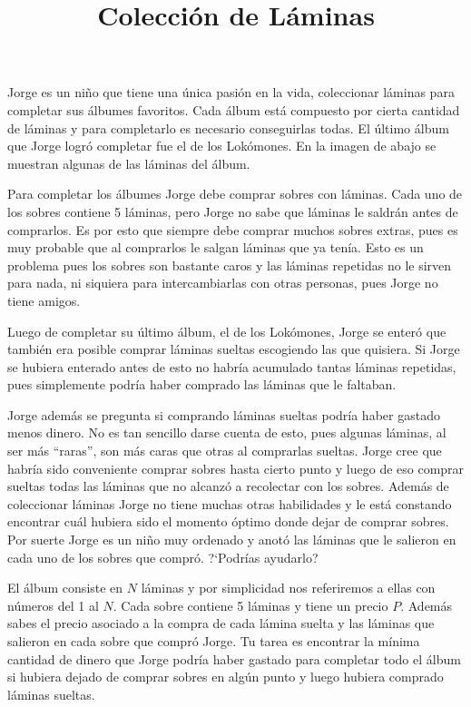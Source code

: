 \documentclass{article}
\title{Colección de Láminas}
\begin{document}
\maketitle

Jorge es un niño que tiene una única pasión en la vida, coleccionar láminas para
completar sus álbumes favoritos. Cada álbum está compuesto por cierta cantidad
de láminas y para completarlo es necesario conseguirlas todas. El último álbum
que Jorge logró completar fue el de los Lokómones. En la imagen de abajo se
muestran algunas de las láminas del álbum.

Para completar los álbumes Jorge debe comprar sobres con láminas. Cada uno de
los sobres contiene 5 láminas, pero Jorge no sabe que láminas le saldrán antes
de comprarlos. Es por esto que siempre debe comprar muchos sobres extras, pues
es muy probable que al comprarlos le salgan láminas que ya tenía. Esto es un
problema pues los sobres son bastante caros y las láminas repetidas no le sirven
para nada, ni siquiera para intercambiarlas con otras personas, pues Jorge no
tiene amigos.

Luego de completar su último álbum, el de los Lokómones, Jorge se enteró que
también era posible comprar láminas sueltas escogiendo las que quisiera. Si
Jorge se hubiera enterado antes de esto no habría acumulado tantas láminas
repetidas, pues simplemente podría haber comprado las láminas que le faltaban.

Jorge además se pregunta si comprando láminas sueltas podría haber gastado menos
dinero. No es tan sencillo darse cuenta de esto, pues algunas láminas, al ser más
``raras'', son más caras que otras al comprarlas sueltas. Jorge cree que habría
sido conveniente comprar sobres hasta cierto punto y luego de eso comprar
sueltas todas las láminas que no alcanzó a recolectar con los sobres. Además de
coleccionar láminas Jorge no tiene muchas otras habilidades y le está constando
encontrar cuál hubiera sido el momento óptimo donde dejar de comprar sobres. Por
suerte Jorge es un niño muy ordenado y anotó las láminas que le salieron en
cada uno de los sobres que compró. ?`Podrías ayudarlo?

El álbum consiste en $N$ láminas y por simplicidad nos referiremos a ellas con
números del 1 al $N$. Cada sobre contiene 5 láminas y tiene un precio $P$.
Además sabes el precio asociado a la compra de cada lámina suelta y las láminas
que salieron en cada sobre que compró Jorge. Tu tarea es encontrar la mínima
cantidad de dinero que Jorge podría haber gastado para completar todo el álbum
si hubiera dejado de comprar sobres en algún punto y luego hubiera comprado
láminas sueltas.
\end{document}
